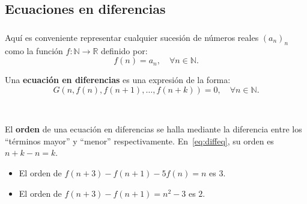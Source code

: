 \subsection{Ecuaciones en diferencias}

\begin{frame}
\frametitle{\secname}
\framesubtitle{\subsecname}

Aquí es conveniente representar cualquier sucesión de números reales $(a_{n})_{n} $ como la función $f\colon\mathds{N}\rightarrow\mathds{R}$ definido por: \[ f(n)=a_{n},\quad\forall n\in\mathds{N}. \]

\begin{definition}
	Una \textbf{ecuación en diferencias} es una expresión de la forma:
		\begin{equation}\label{eq:diffeq}
			G\left(n,f(n),f\left(n+1\right),\ldots,f\left(n+k\right)\right)=0,\quad\forall n\in\mathds{N}.
		\end{equation}
\end{definition}

\

El \textbf{orden} de una ecuación en diferencias se halla mediante la diferencia entre los ``términos mayor'' y ``menor'' respectivamente. En~\eqref{eq:diffeq}, su orden es \alert{$n+k-n=k$}.%

\begin{example}
	\begin{itemize}
		\item El \alert{orden} de $f\left(n+3\right)-f\left(n+1\right)-5f(n)=n$ es \alert{$3$}.
		\item El \alert{orden} de $f\left(n+3\right)-f\left(n+1\right)=n^{2}-3$ es \alert{$2$}.
	\end{itemize}
\end{example}
\end{frame}

